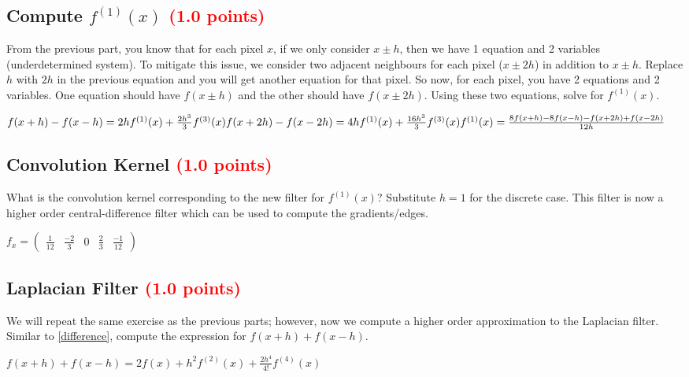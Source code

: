 \documentclass[answers]{exam}
\newcommand{\mypoints}[1]{\textcolor{red}{(#1 points)}}
\begin{document}
\subsection{Compute $f^{(1)}(x)$ \mypoints{1.0}}
\label{gradient}
From the previous part, you know that for each pixel $x$, if we only consider $x \pm h$, then we have 1 equation and 2 variables (underdetermined system). To mitigate this issue, we consider two adjacent neighbours for each pixel ($x \pm 2h$) in addition to $x \pm h$. Replace $h$ with $2h$ in the previous equation and you will get another equation for that pixel. So now, for each pixel, you have 2 equations and 2 variables. One equation should have $f(x \pm h)$ and the other should have $f(x \pm 2h)$. Using these two equations, solve for $f^{(1)}(x)$.
\begin{solution}
$
f(x+h)-f(x-h)=2 h f^{(1)}(x)+\frac{2h^{3}}{3} f^{(3)}(x) \\
f(x+2h)-f(x-2h)=4 h f^{(1)}(x)+\frac{16h^{3}}{3} f^{(3)}(x) \\\\
f^{(1)}(x) = \frac{8f(x+h)-8f(x-h)-f(x+2h)+f(x-2h)}{12 h}
$
\end{solution}

\subsection{Convolution Kernel \mypoints{1.0}}
What is the convolution kernel corresponding to the new filter for $f^{(1)}(x)$? Substitute $h=1$ for the discrete case. This filter is now a higher order central-difference filter which can be used to compute the gradients/edges.
\begin{solution}
$
f_x = \begin{pmatrix}
\frac{1}{12} & \frac{-2}{3} & 0 & \frac{2}{3} & \frac{-1}{12}
\end{pmatrix}
$
\end{solution}

\subsection{Laplacian Filter \mypoints{1.0}}
We will repeat the same exercise as the previous parts; however, now we compute a higher order approximation to the Laplacian filter. Similar to \ref{difference}, compute the expression for $f(x+h) + f(x-h)$.
\begin{solution}
$
f(x+h)+f(x-h)=2f(x) + h^2 f^{(2)}(x)+\frac{2h^{4}}{4!} f^{(4)}(x)
$
\end{solution}
\end{document}
